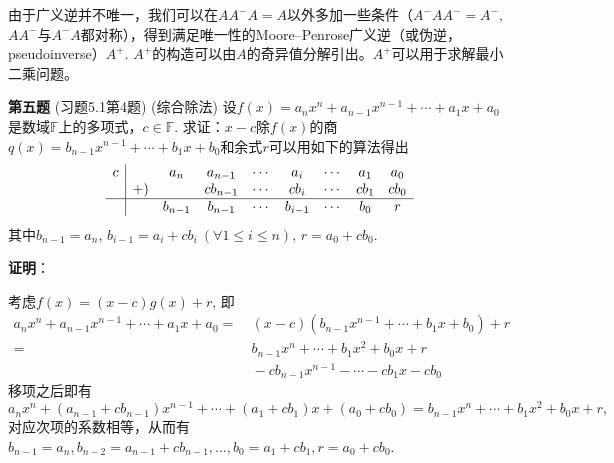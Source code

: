 \vspace{1em}

由于广义逆并不唯一，我们可以在$AA^-A = A$以外多加一些条件（$A^-AA^- = A^-,$ $AA^-$与$A^-A$都对称），得到满足唯一性的Moore–Penrose广义逆（或伪逆，pseudoinverse）$A^+.$ $A^+$的构造可以由$A$的奇异值分解引出。$A^+$可以用于求解最小二乘问题。

\fi  %

\newpageorvspace

{\bf 第五题} (习题5.1第4题) (综合除法) 设$f(x) = a_nx^n + a_{n-1}x^{n-1} + \cdots + a_1x + a_0$是数域$\mathbb{F}$上的多项式，$c\in\mathbb{F}$. 求证：$x-c$除$f(x)$的商$q(x) = b_{n-1}x^{n-1} + \cdots + b_1x + b_0$和余式$r$可以用如下的算法得出
$$
\begin{array}{c|cccccccc}
c & & a_n & a_{n-1} & \cdots & a_i & \cdots & a_1 & a_0 \\
& +) & & cb_{n-1} & \cdots & cb_i & \cdots & cb_1 & cb_0 \\ \hline
& & b_{n-1} & b_{n-1} & \cdots & b_{i-1} & \cdots & b_0 & r
\end{array}
$$
其中$b_{n-1} = a_n$, $b_{i-1} = a_i + cb_i \ (\forall 1 \leqslant i \leqslant n)$, $r = a_0 + cb_0$.

\ifIncludeAnswer

\newpageorvspace

\textbf{证明}：

考虑$f(x) = (x-c)g(x) + r$, 即
\begin{align*}
a_nx^n + a_{n-1}x^{n-1} + \cdots + a_1x + a_0 = & \ (x-c) (b_{n-1}x^{n-1} + \cdots + b_1x + b_0) + r \\
= & \ b_{n-1}x^{n} + \cdots + b_1x^2 + b_0x + r \\
& \ - cb_{n-1}x^{n-1} - \cdots - cb_1x - cb_0
\end{align*}
移项之后即有
$$a_nx^n + (a_{n-1}+cb_{n-1})x^{n-1} + \cdots + (a_1+cb_1)x + (a_0 + cb_0) = b_{n-1}x^{n} + \cdots + b_1x^2 + b_0x + r,$$
对应次项的系数相等，从而有$b_{n-1} = a_n, b_{n-2} = a_{n-1}+cb_{n-1}, \ldots, b_0 = a_1+cb_1, r = a_0 + cb_0$.

\fi  %



